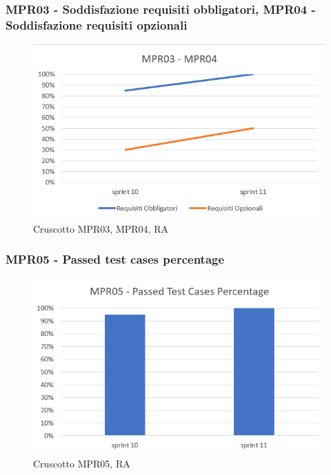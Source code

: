 \subsubsection*{MPR03 - Soddisfazione requisiti obbligatori, MPR04 - Soddisfazione requisiti opzionali}
\begin{figure}[H] 
    \centering
    \includegraphics[scale = 0.8]{immagini/MPR03-04.png}
    \caption{Cruscotto MPR03, MPR04, RA}
\end{figure}

\subsubsection*{MPR05 - Passed test cases percentage}
\begin{figure}[H] 
    \centering
    \includegraphics[scale = 0.8]{immagini/MPR05.png}
    \caption{Cruscotto MPR05, RA}
\end{figure}

